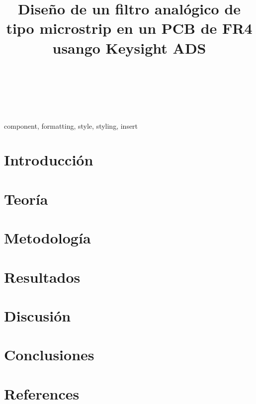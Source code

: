 \documentclass[conference]{IEEEtran}
\begin{document}
\title{Diseño de un filtro analógico de tipo microstrip en un PCB de FR4 usango Keysight ADS \\
}

\author{ \\
\and
{} \\
}

\maketitle

\begin{abstract}

\end{abstract}

\begin{IEEEkeywords}
component, formatting, style, styling, insert
\end{IEEEkeywords}

\section{Introducción}


\section{Teoría}



\section{Metodología}


\section{Resultados}


\section{Discusión}


\section{Conclusiones}


\section*{References}




\end{document}
